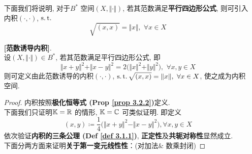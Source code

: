 	\vspace{4em}
	
	下面我们将说明, 对于$B^*$ 空间$(X , \Vert \cdot \Vert)$, 若其范数满足\textbf{平行四边形公式}, 则可引入内积$(\cdot , \cdot)$, $\operatorname{s.t.}$
	\[ \sqrt{(x , x)} = \Vert x \Vert , \,\, \forall x \in X \]
	
	\newpage
	
	\begin{thm}\label{thm 3.2.1}
		\textbf{[范数诱导内积]}. \\
		设$(X , \Vert \cdot \Vert) \in B^*$, 若其范数满足平行四边形公式, 即
		\[ \Vert x + y \Vert^2 + \Vert x - y \Vert^2 = 2 \Big( \Vert x \Vert^2 + \Vert y \Vert^2 \Big) , \,\, \forall x , y \in X \]
		则可定义由此范数诱导的内积$(\cdot , \cdot)$, $\operatorname{s.t.} \sqrt{(x , x)} = \Vert x \Vert , \,\, \forall x \in X$, 使之成为内积空间. 
		
		\vspace{4em}
		
		\begin{proof}
			内积按照\textbf{极化恒等式 (Prop \ref{prop 3.2.2})}定义. \\
			下面我们只证明$\mathbb{K} = \mathbb{R}$ 的情形, $\mathbb{K} = \mathbb{C}$ 可类似证明. 即定义
			\[ (x , y) \coloneqq \frac{1}{4} \Big( \Vert x + y \Vert^2 - \Vert x - y \Vert^2 \Big) , \forall x , y \in X \]
			依次验证\textbf{内积的三条公理 (Def \ref{def 3.1.1})}, \textbf{正定性}及\textbf{共轭对称性}显然成立. \\ 
			下面分两方面来证明\textbf{关于第一变元线性性}：(对加法$\&$ 数乘封闭) 
			
			\vspace{1em}
			

\end{proof}
\end{thm}

